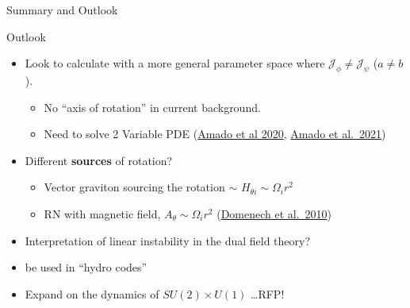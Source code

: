 \documentclass[xcolor=dvipsnames]{beamer}
\begin{document}
\begin{frame}{Summary and Outlook}

  \begin{block}{Outlook}
    \begin{itemize}
      \item
        Look to calculate with a more general parameter space where
        \(\mathcal J_\phi\neq\mathcal J_\psi\) (\(a\neq b\)).

        \begin{itemize}
          \item
            No ``axis of rotation'' in current background.
          \item
            Need to solve 2 Variable PDE (\href{https://inspirehep.net/literature/1780844}{Amado et
            al 2020}, \href{https://inspirehep.net/literature/1844790}{Amado et
            al.~2021})
        \end{itemize}
      \item
        Different \textbf{sources} of rotation?

        \begin{itemize}
          \item
            Vector graviton sourcing the rotation $\sim$ 
            \(H_{\theta i} \sim \Omega_i r^2\)
          \item
            RN with magnetic field, \(A_\theta \sim \Omega_i r^2\)
            (\href{https://inspirehep.net/literature/854786}{Domenech et al.~2010})
        \end{itemize}
      \item
        Interpretation of linear instability in the dual field theory?
      \item
        be used in ``hydro codes''
      \item
        Expand on the dynamics of $SU(2)\times U(1)$ \ldots RFP!
    \end{itemize}
  \end{block}

\end{frame}
\end{document}
